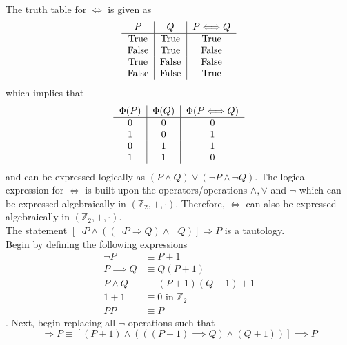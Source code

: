 \documentclass{article}
\begin{document}
\\[0.05in] The truth table for $\Longleftrightarrow$ is given as
\begin{equation*}
\begin{tabular}{c | c | c}
$P$ & $Q$ & $P \Longleftrightarrow Q$ \\ \hline
True & True & True \\
False & True & False \\
True & False & False \\
False & False & True \\
\end{tabular}
\end{equation*}
which implies that
\begin{equation*}
\begin{tabular}{c | c | c}
$\Phi(P)$ & $\Phi(Q)$ & $\Phi(P \Longleftrightarrow Q)$ \\ \hline
0 & 0 & 0 \\
1 & 0 & 1 \\
0 & 1 & 1 \\
1 & 1 & 0 \\
\end{tabular}
\end{equation*}
and can be expressed logically as $(P\wedge Q)\vee (\neg P \wedge \neg Q)$. The logical expression for $\Longleftrightarrow$ is built upon the operators/operations $\wedge, \vee$ and $\neg$ which can be expressed algebraically in $(\mathbb{Z}_2, + , \cdot)$.  Therefore, $\Longleftrightarrow$ can also be expressed algebraically in $(\mathbb{Z}_2, +, \cdot)$.
\\[0.05in] The statement $[\neg P \wedge ((\neg P \Longrightarrow Q) \wedge \neg Q)] \Longrightarrow P$ is a tautology.
\\[0.05in] Begin by defining the following expressions
\begin{align}
\neg P &\equiv P + 1 \label{eqn:1}\\
P \implies Q &\equiv Q(P + 1) \label{eqn:2}\\
P \wedge Q &\equiv (P + 1)(Q + 1) + 1 \label{eqn:4} \\
1 + 1 &\equiv 0 \text{ in } \mathbb{Z}_2  \label{eqn:5}\\
PP &\equiv P \label{eqn:6}
\end{align}.
Next, begin replacing all $\neg$ operations such that
\begin{equation*}
[\neg P \wedge ((\neg P \Longrightarrow Q) \wedge \neg Q)] \Longrightarrow P \equiv [(P + 1)\wedge (((P + 1) \implies Q)\wedge (Q+1))]\implies P
\end{equation*}
\end{document}
